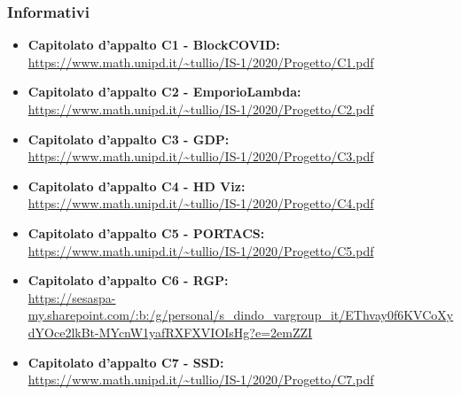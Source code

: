 \subsubsection{Informativi}
\begin{itemize}
\item \textbf{Capitolato d'appalto C1 - BlockCOVID:}\\
\url{https://www.math.unipd.it/~tullio/IS-1/2020/Progetto/C1.pdf}
\item \textbf{Capitolato d'appalto C2 - EmporioLambda:}\\
\url{https://www.math.unipd.it/~tullio/IS-1/2020/Progetto/C2.pdf}
\item \textbf{Capitolato d'appalto C3 - GDP:}\\
\url{https://www.math.unipd.it/~tullio/IS-1/2020/Progetto/C3.pdf}
\item \textbf{Capitolato d'appalto C4 - HD Viz:}\\
\url{https://www.math.unipd.it/~tullio/IS-1/2020/Progetto/C4.pdf}
\item \textbf{Capitolato d'appalto C5 - PORTACS:}\\
\url{https://www.math.unipd.it/~tullio/IS-1/2020/Progetto/C5.pdf}

\item \textbf{Capitolato d'appalto C6 - RGP:}\\
\url{https://sesaspa-my.sharepoint.com/:b:/g/personal/s_dindo_vargroup_it/EThvay0f6KVCoXydYOce2lkBt-MYcnW1yafRXFXVIOIsHg?e=2emZZI}

\item \textbf{Capitolato d'appalto C7 - SSD:}\\
\url{https://www.math.unipd.it/~tullio/IS-1/2020/Progetto/C7.pdf}
\end{itemize}
\fussy
